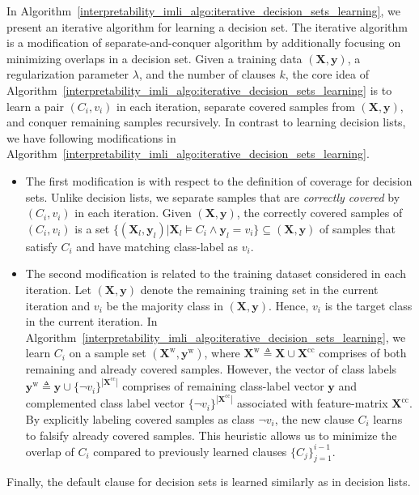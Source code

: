 In Algorithm~\ref{interpretability_imli_algo:iterative_decision_sets_learning}, we present an iterative algorithm for learning a decision set. The iterative algorithm is a modification of separate-and-conquer algorithm  by additionally focusing on minimizing overlaps in a decision set.  Given a training data $ (\mathbf{X}, \mathbf{y}) $, a  regularization parameter $ \lambda $, and the number of clauses $ k $, the core idea of Algorithm~\ref{interpretability_imli_algo:iterative_decision_sets_learning} is to learn a pair $ (C_i,v_i) $ in each iteration, separate covered samples from $ (\mathbf{X}, \mathbf{y}) $, and conquer remaining samples recursively. In contrast to learning decision lists, we have following modifications in Algorithm~\ref{interpretability_imli_algo:iterative_decision_sets_learning}. 

\begin{itemize}
	\item The first modification is with respect to the definition of coverage for decision sets. Unlike decision lists, we separate samples that are \textit{correctly covered} by $ (C_i, v_i) $ in each iteration. Given  $ (\mathbf{X}, \mathbf{y}) $, the correctly covered samples of $ (C_i, v_i) $ is a set $  \{(\mathbf{X}_l, \mathbf{y}_l)| \mathbf{X}_l \models C_i \wedge \mathbf{y}_l = v_i \} \subseteq (\mathbf{X}, \mathbf{y}) $ of samples that satisfy $ C_i $ and have matching class-label as $ v_i $. 
	\item The second modification is related to the  training dataset considered in each iteration. Let $ (\mathbf{X},\mathbf{y}) $ denote the remaining training set in the current iteration and $ v_i $ be the majority class in  $ (\mathbf{X},\mathbf{y}) $. Hence, $ v_i $ is the target class in the current iteration. In Algorithm~\ref{interpretability_imli_algo:iterative_decision_sets_learning}, we learn $ C_i $ on a sample set $ (\mathbf{X}^\text{w},\mathbf{y}^\text{w}) $, where $ \mathbf{X}^\text{w} \triangleq \mathbf{X} \cup \mathbf{X}^\text{cc} $ comprises of both remaining and already covered samples. However, the vector of class labels $ \mathbf{y}^\text{w} \triangleq  \mathbf{y} \cup  \{\neg v_i\}^{|\mathbf{X}^\text{cc}|} $  comprises of remaining class-label vector $ \mathbf{y} $ and complemented class label vector $ \{\neg v_i\}^{|\mathbf{X}^\text{cc}|} $ associated with feature-matrix $ \mathbf{X}^\text{cc} $. By explicitly labeling covered samples as class $ \neg v_i $, the new clause $ C_i $ learns to falsify already covered samples. This heuristic allows us to minimize the overlap of $ C_i $ compared to previously learned clauses $ \{C_j\}_{j=1}^{i-1} $.
\end{itemize}

Finally, the default clause for decision sets is learned similarly as in decision lists. 





\newcommand{\maxsatquery}{\ensuremath{\mathsf{ConstructQuery}}}
\newcommand{\createclause}{\ensuremath{\mathsf{ConstructClause}}}
\newcommand{\iterativeClauseLearning}{\ensuremath{\mathsf{IterativeClauseLearning}}}
\let\oldReturn\Return
\renewcommand{\Return}{\State\oldReturn}
